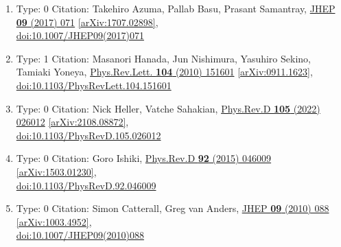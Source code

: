 \documentclass[a4paper,10pt]{article}
\begin{document}
\begin{enumerate}
\begin{enumerate}
  \item Type: 0 Citation: Takehiro Azuma, Pallab Basu, Prasant Samantray, \href{https://www.doi.org/10.1007/JHEP09(2017)071}{JHEP {\bf 09} (2017) 071}  \href{https://arxiv.org/abs/1707.02898}{[arXiv:1707.02898]},\\\href{https://www.doi.org/10.1007/JHEP09(2017)071}{doi:10.1007/JHEP09(2017)071}
  \item Type: 1 Citation: Masanori Hanada, Jun Nishimura, Yasuhiro Sekino, Tamiaki Yoneya, \href{https://www.doi.org/10.1103/PhysRevLett.104.151601}{Phys.Rev.Lett. {\bf 104} (2010) 151601}  \href{https://arxiv.org/abs/0911.1623}{[arXiv:0911.1623]},\\\href{https://www.doi.org/10.1103/PhysRevLett.104.151601}{doi:10.1103/PhysRevLett.104.151601}
  \item Type: 0 Citation: Nick Heller, Vatche Sahakian, \href{https://www.doi.org/10.1103/PhysRevD.105.026012}{Phys.Rev.D {\bf 105} (2022) 026012}  \href{https://arxiv.org/abs/2108.08872}{[arXiv:2108.08872]},\\\href{https://www.doi.org/10.1103/PhysRevD.105.026012}{doi:10.1103/PhysRevD.105.026012}
  \item Type: 0 Citation: Goro Ishiki, \href{https://www.doi.org/10.1103/PhysRevD.92.046009}{Phys.Rev.D {\bf 92} (2015) 046009}  \href{https://arxiv.org/abs/1503.01230}{[arXiv:1503.01230]},\\\href{https://www.doi.org/10.1103/PhysRevD.92.046009}{doi:10.1103/PhysRevD.92.046009}
  \item Type: 0 Citation: Simon Catterall, Greg van Anders, \href{https://www.doi.org/10.1007/JHEP09(2010)088}{JHEP {\bf 09} (2010) 088}  \href{https://arxiv.org/abs/1003.4952}{[arXiv:1003.4952]},\\\href{https://www.doi.org/10.1007/JHEP09(2010)088}{doi:10.1007/JHEP09(2010)088}

\end{enumerate}
\end{enumerate}
\end{document}
